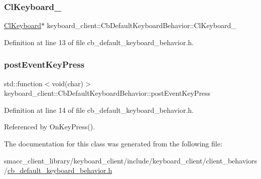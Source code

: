 \subsubsection{\texorpdfstring{Cl\+Keyboard\+\_\+}{ClKeyboard\_}}
{\footnotesize\ttfamily \hyperlink{classkeyboard__client_1_1ClKeyboard}{Cl\+Keyboard}$\ast$ keyboard\+\_\+client\+::\+Cb\+Default\+Keyboard\+Behavior\+::\+Cl\+Keyboard\+\_\+}



Definition at line 13 of file cb\+\_\+default\+\_\+keyboard\+\_\+behavior.\+h.

\mbox{\label{classkeyboard__client_1_1CbDefaultKeyboardBehavior_ac3a5e8c2cca0fd4117ddc192858d3771}} 
\subsubsection{\texorpdfstring{post\+Event\+Key\+Press}{postEventKeyPress}}
{\footnotesize\ttfamily std\+::function$<$void(char)$>$ keyboard\+\_\+client\+::\+Cb\+Default\+Keyboard\+Behavior\+::post\+Event\+Key\+Press}



Definition at line 14 of file cb\+\_\+default\+\_\+keyboard\+\_\+behavior.\+h.



Referenced by On\+Key\+Press().



The documentation for this class was generated from the following file\+:\begin{DoxyCompactItemize}
\item 
smacc\+\_\+client\+\_\+library/keyboard\+\_\+client/include/keyboard\+\_\+client/client\+\_\+behaviors/\hyperlink{cb__default__keyboard__behavior_8h}{cb\+\_\+default\+\_\+keyboard\+\_\+behavior.\+h}\end{DoxyCompactItemize}
